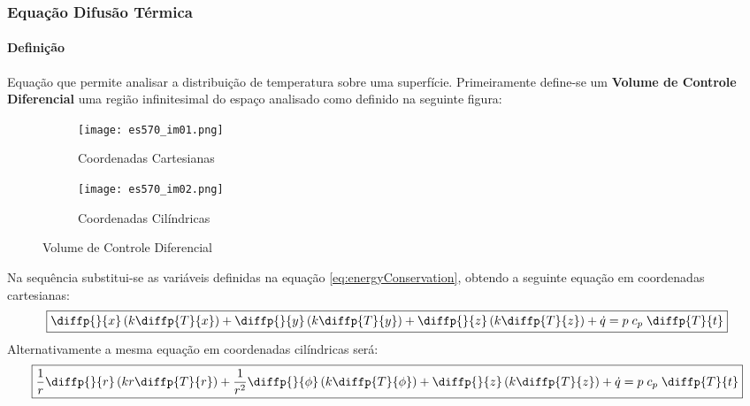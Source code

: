 \documentclass{article}
\begin{document}
        \subsubsection{Equação Difusão Térmica}
            \paragraph{Definição}Equação que permite analisar a distribuição de temperatura sobre uma superfície. Primeiramente define-se um \textbf{Volume de Controle Diferencial} uma região infinitesimal do espaço analisado como definido na seguinte figura:
                \begin{figure}[H]
                    \begin{subfigure}[t]{0.45\textwidth}
                        \centering
                        \texttt{[image: es570\_im01.png]}
                        \caption{Coordenadas Cartesianas}
                    \end{subfigure}
                    \begin{subfigure}[t]{0.45\textwidth}
                        \centering
                        \texttt{[image: es570\_im02.png]}
                        \caption{Coordenadas Cilíndricas}
                    \end{subfigure}
                    \caption{Volume de Controle Diferencial}
                \end{figure} \noindent
            Na sequência substitui-se as variáveis definidas na equação \ref{eq:energyConservation}, obtendo a seguinte equação em coordenadas cartesianas:
                \begin{equation}
                    \boxed{
                        \diffp{}{x}\left(k\diffp{T}{x}\right) + 
                        \diffp{}{y}\left(k\diffp{T}{y}\right) + 
                        \diffp{}{z}\left(k\diffp{T}{z}\right) + 
                        \dot{q} = 
                        p\;c_{p}\;\diffp{T}{t}
                    }
                \end{equation}
            Alternativamente a mesma equação em coordenadas cilíndricas será:
                \begin{equation}
                    \boxed{
                        \frac{1}{r}\diffp{}{r}\left(kr\diffp{T}{r}\right) + 
                        \frac{1}{r^2}\diffp{}{\phi}\left(k\diffp{T}{\phi}\right) + 
                        \diffp{}{z}\left(k\diffp{T}{z}\right) + 
                        \dot{q} = 
                        p\;c_{p}\;\diffp{T}{t}
                    }
                \end{equation}
\end{document}
